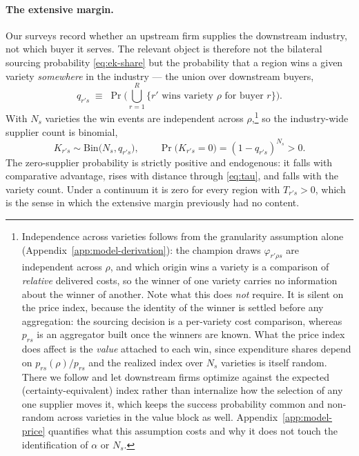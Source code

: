 \paragraph{The extensive margin.} Our surveys record whether an upstream firm supplies the
downstream industry, not which buyer it serves. The relevant object is therefore not the
bilateral sourcing probability \eqref{eq:ek-share} but the probability that a region wins a
given variety \emph{somewhere} in the industry --- the union over downstream buyers,
\begin{equation}
q_{r's}\;\equiv\;\Pr\Big(\bigcup_{r=1}^{R}\big\{\text{$r'$ wins variety $\rho$ for buyer $r$}\big\}\Big).
\label{eq:q}
\end{equation}
With $N_{s}$ varieties the win events are independent across $\rho$,\footnote{Independence
across varieties follows from the granularity assumption alone (Appendix~\ref{app:model-derivation}):
the champion draws
$\varphi_{r'\rho s}$ are independent across $\rho$, and which origin wins a variety is a
comparison of \emph{relative} delivered costs, so the winner of one variety carries no
information about the winner of another. Note what this does \emph{not} require. It is silent
on the price index, because the identity of the winner is settled before any aggregation: the
sourcing decision is a per-variety cost comparison, whereas $p_{rs}$ is an aggregator built
once the winners are known. What the price index does affect is the \emph{value} attached to
each win, since expenditure shares depend on $p_{rs}(\rho)/p_{rs}$ and the realized index over
$N_{s}$ varieties is itself random. There we follow \citet{lmm2023} and let downstream firms
optimize against the expected (certainty-equivalent) index rather than internalize how the
selection of any one supplier moves it, which keeps the success probability common and
non-random across varieties in the value block as well. Appendix~\ref{app:model-price}
quantifies what this assumption costs and why it does not touch the identification of $\alpha$
or $N_{s}$.} so the industry-wide supplier count is binomial,
\begin{equation}
K_{r's}\sim\mathrm{Bin}\big(N_{s},q_{r's}\big),
\qquad
\Pr\big(K_{r's}=0\big)=(1-q_{r's})^{N_{s}}>0 .
\label{eq:binomial}
\end{equation}
The zero-supplier probability is strictly positive and endogenous: it falls with comparative
advantage, rises with distance through \eqref{eq:tau}, and falls with the variety count. Under
a continuum it is zero for every region with $T_{r's}>0$, which is the sense in which the
extensive margin previously had no content.

